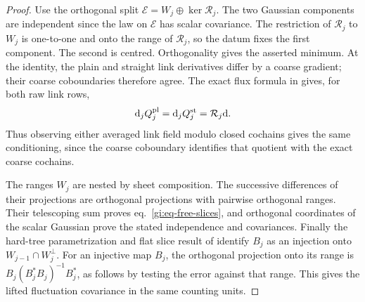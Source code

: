 \documentclass[11pt,letterpaper,reqno]{amsart}
\numberwithin{equation}{section}
\renewcommand{\eqref}[1]{\textup{eq.~\ref{#1}}}
\theoremstyle{definition}
\theoremstyle{remark}
\begin{document}
\begin{proof}
Use the orthogonal split
\(\mathcal E=W_j\oplus\ker\mathcal R_j\).
The two Gaussian components are independent since the
law on \(\mathcal E\) has scalar covariance. The restriction
of \(\mathcal R_j\) to \(W_j\) is one-to-one and onto the
range of \(\mathcal R_j\), so the datum fixes the first
component. The second is centred. Orthogonality gives
the asserted minimum. At the identity, the plain and
straight link derivatives differ by a coarse gradient;
their coarse coboundaries therefore agree. The exact
flux formula in \cite[The flat derivative and its curl]{BA}
gives, for both raw link rows,
\begin{equation}\label{gi:eq-plain-straight-flux}
 \mathrm d_j Q_j^{\rm pl}=\mathrm d_j Q_j^{\rm st}
                         =\mathcal R_j\mathrm d .
\end{equation}
Thus observing either averaged link field modulo
closed cochains gives the same conditioning, since the
coarse coboundary identifies that quotient with the
exact coarse cochains.

The ranges \(W_j\) are nested by sheet composition.
The successive differences of their projections are
orthogonal projections with pairwise orthogonal ranges.
Their telescoping sum proves \eqref{gi:eq-free-slices},
and orthogonal coordinates of the scalar Gaussian
prove the stated independence and covariances. Finally
the hard-tree parametrization and flat slice result of
\cite[Kernel of a flat curvature slice]{MB}
identify \(B_j\) as an injection onto
\(W_{j-1}\cap W_j^\perp\). For an injective map \(B_j\),
the orthogonal projection onto its range is
\(B_j(B_j^*B_j)^{-1}B_j^*\), as follows by testing
the error against that range. This gives the lifted
fluctuation covariance in the same counting units.
\end{proof}
\end{document}
